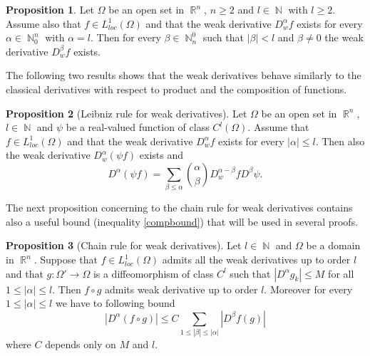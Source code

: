\documentclass[12pt]{article}
\theoremstyle{definition}
\newtheorem{prop}{Proposition}
\DeclareMathOperator\rr{\mathbb{R}}
\DeclareMathOperator\nn{\mathbb{N}}
\begin{document}
\begin{prop}
	Let $\Omega$ be an open set in $\rr^n$, $n \ge2$ and $l \in \nn$ with $l\ge2$. Assume also that $f \in L^1_{loc}(\Omega)$ and that the weak derivative $D^\alpha_wf $ exists for every $\alpha\in \nn^n_0$ with $\alpha=l$. Then for every $\beta \in \nn^0_n$ such that $|\beta|<l$ and $\beta \neq 0$ the weak derivative $D^\beta_w f$ exists.
\end{prop}
The following two results shows that the weak derivatives behave similarly to the classical derivatives with respect to product and the composition of functions. 
\begin{prop}[Leibniz rule for weak derivatives]
	Let $\Omega$ be an open set in $\rr^n$, $l\in \nn$ and $\psi$ be a real-valued function of class $C^l(\Omega)$.  Assume that $f \in L^1_{loc}(\Omega)$ and that the weak derivative $D^\alpha_wf$ exists for every $|\alpha|\le l.$ Then also the weak derivative $D^\alpha_w(\psi f)$ exists and  
	\[ D^\alpha(\psi f)=\sum_{\beta \le \alpha} {\alpha \choose \beta} D^{\alpha-\beta}_wfD^\beta \psi.\]
\end{prop}
The next proposition concerning to the chain rule for weak derivatives contains also a useful bound (inequality \eqref{compbound}) that will be used in several proofs.
\begin{prop}[Chain rule for weak derivatives]\label{composition}
Let $l \in \nn$ and $\Omega$ be a domain in $\rr^n$. Suppose that $f \in L^1_{loc}(\Omega)$ admits all the weak derivatives up to order $l$ and that $g:\Omega'\rightarrow \Omega$ is a diffeomorphism of class $C^l$ such that $|D^\alpha g_k|\le M$ for all $1 \le |\alpha| \le l$. Then $f\circ g$ admits weak derivative up to order $l$. Moreover for every $1\le |\alpha|\le l$ we have to following bound
\begin{equation} |D^\alpha (f\circ g)|\le C \sum_{1\le|\beta|\le |\alpha|} |D^\beta f(g)| \label{compbound}
\end{equation}
where $C$ depends only on $M$ and $l$.
\end{prop}
\end{document}
